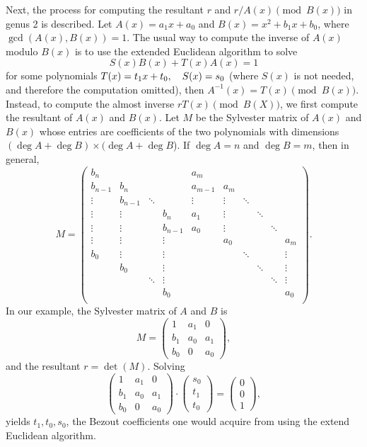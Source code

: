 Next, the process for computing the resultant $r$ and $r/A(x) \pmod{B(x)}$ in
genus 2 is described. Let $A(x) = a_1x + a_0$ and $B(x) = x^2 + b_1x + b_0$,
where $\gcd (A(x),B(x)) = 1$. The usual way to compute the inverse of $A(x)$
modulo $B(x)$ is to use the extended Euclidean algorithm to solve $$ S(x)B(x) +
T(x)A(x) = 1$$ for some polynomials $T(x) = t_1x + t_0, \quad S(x) = s_0$ (where
$S(x)$ is not needed, and therefore the computation omitted), then $A^{-1}(x) =
T(x) \pmod{B(x)}$.  Instead, to compute the almost inverse $rT(x) \pmod{B(X)}$,
we first compute the resultant of $A(x)$ and $B(x)$. Let $M$ be the Sylvester
matrix of $A(x)$ and $B(x)$ whose entries are coefficients of the two polynomials with dimensions
$(\deg A + \deg B) \times (\deg A + \deg B$). If $\deg A = n$ and $\deg B =m$,
then in general,
$$ M =   \left( \begin{array}{cccccccccc}
b_n     &         &        &        &a_m    &        &        &    	   &    	&		\\
b_{n-1} & b_n     &        &        &a_{m-1}& a_m    &        &    	   &		&		\\
\vdots  & b_{n-1} & \ddots &        &\vdots & \vdots & \ddots & 	   &		&		\\
\vdots  & \vdots  &        & b_n    &a_1    & \vdots &        & \ddots &		&		\\
\vdots  & \vdots  &		   & b_{n-1}&a_0    & \vdots &		  &		   & \ddots &		\\
\vdots  & \vdots  &        & \vdots &		& a_0    &		  &		   &		& a_m	\\
b_0     & \vdots  &		   & \vdots &		& 		 & \ddots &		   &		& \vdots\\
        & b_0     &        & \vdots &		&		 &		  & \ddots & 		& \vdots\\
        &         & \ddots & \vdots &		&		 &		  &        & \ddots & \vdots\\
        &         &        & b_0    &		&		 &        &		   &		& a_0	\\
\end{array} \right).$$ In our example, the Sylvester matrix of $A$ and $B$ is
$$ M =   \left( \begin{array}{ccc}
1   & a_1 & 0  \\
b_1 & a_0 & a_1  \\
b_0 & 0   & a_0  \end{array} \right),$$ and the resultant $r = \det (M).$ Solving 
$$\left( \begin{array}{ccc}
1   & a_1 & 0  \\
b_1 & a_0 & a_1  \\
b_0 & 0   & a_0  \end{array} \right) \cdot \left( \begin{array}{c}
s_0     \\
t_1   \\
t_0   \end{array} \right) = \left( \begin{array}{c}
0 \\
0 \\
1 \end{array} \right), $$ yields $t_1, t_0,s_0$, the Bezout coefficients one
would acquire from using the extend Euclidean algorithm. 

